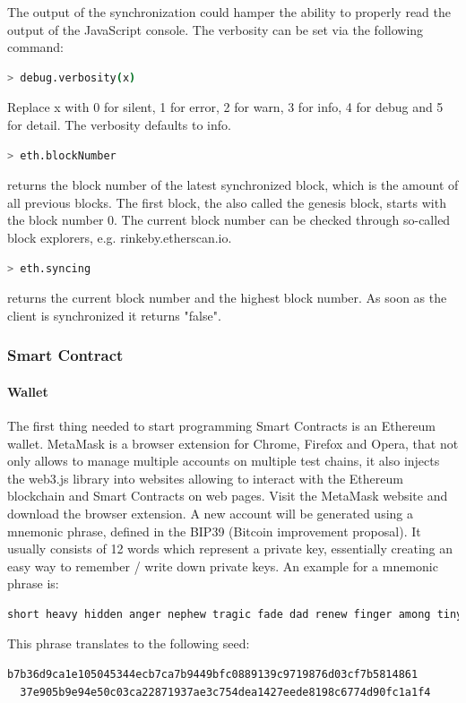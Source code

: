 The output of the synchronization could hamper the ability to properly read the output of the JavaScript console. The verbosity can be set via the following command:

\begin{lstlisting}[language=bash, numbers=none]
  > debug.verbosity(x)
\end{lstlisting}

Replace x with 0 for silent, 1 for error, 2 for warn, 3 for info, 4 for debug and 5 for detail. The verbosity defaults to info\cite{cli-options}.
\newpage

\begin{lstlisting}[language=bash, numbers=none]
  > eth.blockNumber
\end{lstlisting}

returns the block number of the latest synchronized block, which is the amount of all previous blocks. The first block, the also called the genesis block, starts with the block number 0. The current block number can be checked through so-called block explorers, e.g. {rinkeby.etherscan.io}.
\\
\begin{lstlisting}[language=bash, numbers=none]
  > eth.syncing
\end{lstlisting}
returns the current block number and the highest block number. As soon as the client is synchronized it returns "false"\cite{javascript-0.20}.
\\
\subsubsection{Smart Contract}
\paragraph{Wallet}
The first thing needed to start programming Smart Contracts is an Ethereum wallet. MetaMask is a browser extension for Chrome, Firefox and Opera, that not only allows to manage multiple accounts on multiple test chains, it also injects the web3.js library into websites allowing to interact with the Ethereum blockchain and Smart Contracts on web pages.
Visit the MetaMask\cite{metamask} website and download the browser extension. A new account will be generated using a mnemonic phrase, defined in the BIP39 (Bitcoin improvement proposal)\cite{bip39}. It usually consists of 12 words which represent a private key, essentially creating an easy way to remember / write down private keys. An example for a mnemonic phrase is:
\begin{lstlisting}[language=bash, numbers=none]
  short heavy hidden anger nephew tragic fade dad renew finger among tiny
\end{lstlisting}
This phrase translates to the following seed:
\begin{lstlisting}[language=bash, numbers=none]
  b7b36d9ca1e105045344ecb7ca7b9449bfc0889139c9719876d03cf7b5814861
  37e905b9e94e50c03ca22871937ae3c754dea1427eede8198c6774d90fc1a1f4
\end{lstlisting}

